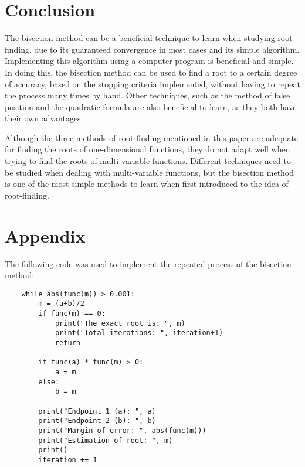 \documentclass{article}
\begin{document}
\section{Conclusion}
The bisection method can be a beneficial technique to learn when studying root-finding, due to its guaranteed convergence in most cases and its simple algorithm. Implementing this algorithm using a computer program is beneficial and simple. In doing this, the bisection method can be used to find a root to a certain degree of accuracy, based on the stopping criteria implemented, without having to repeat the process many times by hand. Other techniques, such as the method of false position and the quadratic formula are also beneficial to learn, as they both have their own advantages.
\par Although the three methods of root-finding mentioned in this paper are adequate for finding the roots of one-dimensional functions, they do not adapt well when trying to find the roots of multi-variable functions. Different techniques need to be studied when dealing with multi-variable functions, but the bisection method is one of the most simple methods to learn when first introduced to the idea of root-finding.


\section{Appendix}
The following code was used to implement the repeated process of the bisection method:

\begin{lstlisting}
    while abs(func(m)) > 0.001:
        m = (a+b)/2
        if func(m) == 0:
            print("The exact root is: ", m)
            print("Total iterations: ", iteration+1)
            return
    
        if func(a) * func(m) > 0:
            a = m
        else:
            b = m
            
        print("Endpoint 1 (a): ", a)
        print("Endpoint 2 (b): ", b)
        print("Margin of error: ", abs(func(m)))
        print("Estimation of root: ", m)
        print()
        iteration += 1
\end{lstlisting}




\end{document}
